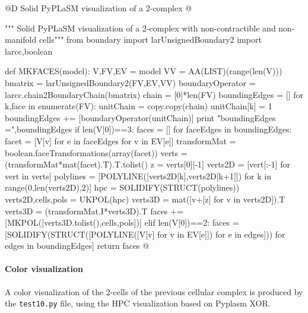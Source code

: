 \documentclass[11pt,oneside]{article}    %
\begin{document}
@D Solid PyPLaSM visualization of a 2-complex
@{""" Solid PyPLaSM visualization of a 2-complex with non-contractible 
      and non-manifold cells"""
from boundary import larUnsignedBoundary2
import larcc,boolean

def MKFACES(model):
    V,FV,EV = model
    VV = AA(LIST)(range(len(V)))
    bmatrix = larUnsignedBoundary2(FV,EV,VV)
    boundaryOperator = larcc.chain2BoundaryChain(bmatrix)
    chain = [0]*len(FV)
    boundingEdges = []
    for k,face in enumerate(FV):
        unitChain = copy.copy(chain)
        unitChain[k] = 1
        boundingEdges += [boundaryOperator(unitChain)]
    print "boundingEdges =",boundingEdges
    if len(V[0])==3:
        faces = []
        for faceEdges in boundingEdges:
            facet = [V[v] for e in faceEdges for v in EV[e]]
            transformMat = boolean.faceTransformations(array(facet))
            verts = (transformMat*mat(facet).T).T.tolist()
            z = verts[0][-1]
            verts2D = [vert[:-1] for vert in verts]
            polylines = [POLYLINE([verts2D[k],verts2D[k+1]]) for k in range(0,len(verts2D),2)]
            hpc = SOLIDIFY(STRUCT(polylines))
            verts2D,cells,pols = UKPOL(hpc)
            verts3D = mat([v+[z] for v in verts2D]).T
            verts3D = (transformMat.I*verts3D).T         
            faces += [MKPOL([verts3D.tolist(),cells,pols])]
    elif len(V[0])==2:
        faces = [SOLIDIFY(STRUCT([POLYLINE([V[v] for v in EV[e]]) for e in edges])) 
            for edges in boundingEdges]
    return faces
@}


\paragraph{Color visualization}
A color visualization of the 2-cells of the previous cellular complex is produced by the \texttt{test10.py} file, using the HPC visualization based on Pyplasm XOR.
\end{document}
